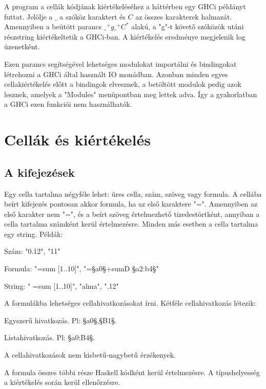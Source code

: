 A program a cellák kódjának kiértékeléséhez a háttérben egy GHCi példányt futtat. Jelölje a $\_$ a szóköz karaktert és $C$ az összes karakterek halmazát. Amennyiben a beütött parancs $\_^+g\_^+C^*$ alakú, a "g"-t követő szóközök utáni részstring kiértékeltetik a GHCi-ban. A kiértékelés eredménye megjelenik log üzenetként. 

Ezen parancs segítségével lehetséges modulokat importálni és bindingokat létrehozni a GHCi által használt IO monádban. Azonban minden egyes cellakiértékelés előtt a bindingok elvesznek, a betöltött modulok pedig azok lesznek, amelyek a "Modules" menüpontban meg lettek adva. Így a gyakorlatban a GHCi ezen funkciói nem használhatók.

\section{Cellák és kiértékelés}

\subsection{A kifejezések}

Egy cella tartalma négyféle lehet: üres cella, szám, szöveg vagy formula. A cellába beírt kifejezés pontosan akkor formula, ha az első karaktere "=". Amennyiben az első karakter nem "=", és a beírt szöveg értelmezhető tizedestörtként, annyiban a cella tartalma számként kerül értelmezésre. Minden más esetben a cella tartalma egy string. Példák:
\begin{compactenum}
	\item Szám: "0.12", "11"
	\item Formula: "=sum [1..10]", "=§a0§+sumD §a2:b4§"
	\item String: " =sum [1..10]", "alma", ".12"
\end{compactenum}

A formulákba lehetséges cellahivatkozásokat írni. Kétféle cellahivatkozás létezik:
\begin{compactenum}
	\item Egyszerű hivatkozás. Pl: §a0§,§B1§.
	\item Listahivatkozás. Pl: §a0:B4§.
\end{compactenum}

A cellahivatkozások nem kisbetű-nagybetű érzékenyek.

A formula összes többi része Haskell kódként kerül értelmezésre. A típushelyesség a kiértékelés során kerül ellenőrzésre.

